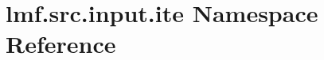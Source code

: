 \hypertarget{namespacelmf_1_1src_1_1input_1_1ite}{\section{lmf.\+src.\+input.\+ite Namespace Reference}
\label{namespacelmf_1_1src_1_1input_1_1ite}
}
